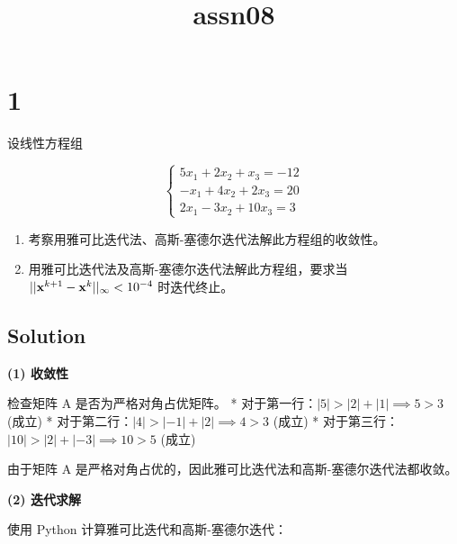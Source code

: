 \documentclass[11pt]{article}
\title{assn08}
\begin{document}
    
    \maketitle
    
    

    
    \section{1}\label{section}

设线性方程组

\[
\begin{cases}
5x_1 + 2x_2 + x_3 = -12\\
-x_1 + 4x_2 + 2x_3 = 20\\
2x_1 - 3x_2 + 10x_3 = 3
\end{cases}
\]

\begin{enumerate}
\def\labelenumi{(\arabic{enumi})}
\item
  考察用雅可比迭代法、高斯-塞德尔迭代法解此方程组的收敛性。
\item
  用雅可比迭代法及高斯-塞德尔迭代法解此方程组，要求当
  \(||\bold{x}^{k + 1} - \bold{x}^k||_{\infty} < 10^{-4}\) 时迭代终止。
\end{enumerate}

    \subsection{Solution}\label{solution}

\textbf{(1) 收敛性}

检查矩阵 A 是否为严格对角占优矩阵。 *
对于第一行：\(|5| > |2| + |1| \implies 5 > 3\) (成立) *
对于第二行：\(|4| > |-1| + |2| \implies 4 > 3\) (成立) *
对于第三行：\(|10| > |2| + |-3| \implies 10 > 5\) (成立)

由于矩阵 A 是严格对角占优的，因此雅可比迭代法和高斯-塞德尔迭代法都收敛。

\textbf{(2) 迭代求解}

使用 Python 计算雅可比迭代和高斯-塞德尔迭代：
\end{document}
